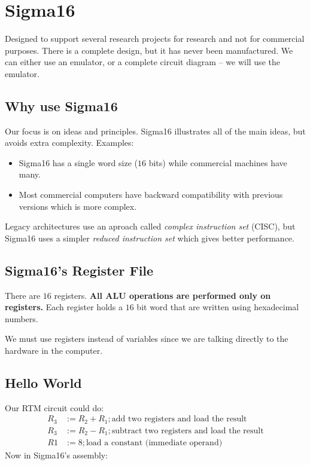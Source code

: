 \section{Sigma16}\label{sec:sigma16}

Designed to support several research projects for research and not for commercial purposes.
There is a complete design, but it has never been manufactured.
We can either use an emulator, or a complete circuit diagram -- we will use the emulator.

\subsection{Why use Sigma16}\label{sub:why_use_sigma16}

Our focus is on ideas and principles.
Sigma16 illustrates all of the main ideas, but avoids extra complexity.
Examples:
\begin{itemize}
	\item Sigma16 has a single word size (\(16\) bits) while commercial machines have many.
	\item Most commercial computers have backward compatibility with previous versions which is more complex.
\end{itemize}
Legacy architectures use an aproach called \emph{complex instruction set} (CISC), but Sigma16 uses a simpler \emph{reduced instruction set} which gives better performance.

\subsection{Sigma16's Register File}\label{sub:sigma16_s_register_file}

There are \(16\) registers.
\textbf{All ALU operations are performed only on registers.}
Each register holds a \(16\) bit word that are written using hexadecimal numbers.

We must use registers instead of variables since we are talking directly to the hardware in the computer.

\subsection{Hello World}\label{sub:hello_world}

Our RTM circuit could do:
\begin{align*}
	R_3 & := R_2+R_1 ; \text{add two registers and load the result}     \\
	R_3 & :=R_2-R_1 ; \text{subtract two registers and load the result} \\
	R1  & := 8 ; \text{load a constant (immediate operand)}
\end{align*}
Now in Sigma16's assembly:

